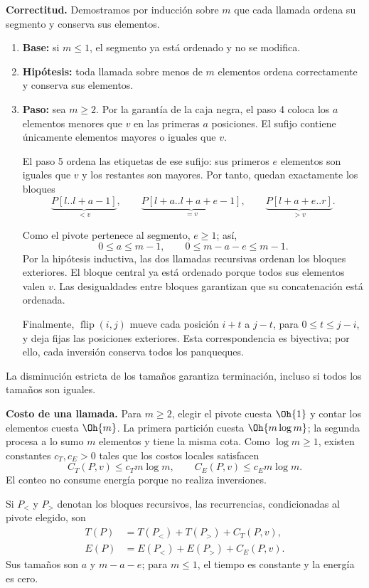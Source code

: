 \textbf{Correctitud.} Demostramos por inducción sobre $m$ que cada llamada ordena su segmento y conserva sus elementos.

\begin{enumerate}
\item \textbf{Base:} si $m\le1$, el segmento ya está ordenado y no se modifica.

\item \textbf{Hipótesis:} toda llamada sobre menos de $m$ elementos ordena correctamente y conserva sus elementos.

\item \textbf{Paso:} sea $m\ge2$. Por la garantía de la caja negra, el paso 4 coloca los $a$ elementos menores que $v$ en las primeras $a$ posiciones. El sufijo contiene únicamente elementos mayores o iguales que $v$.

El paso 5 ordena las etiquetas de ese sufijo: sus primeros $e$ elementos son iguales que $v$ y los restantes son mayores. Por tanto, quedan exactamente los bloques
\[
\underbrace{P[l..l+a-1]}_{<v},\qquad
\underbrace{P[l+a..l+a+e-1]}_{=v},\qquad
\underbrace{P[l+a+e..r]}_{>v}.
\]

Como el pivote pertenece al segmento, $e\ge1$; así,
\[
0\le a\le m-1,\qquad 0\le m-a-e\le m-1.
\]
Por la hipótesis inductiva, las dos llamadas recursivas ordenan los bloques exteriores. El bloque central ya está ordenado porque todos sus elementos valen $v$. Las desigualdades entre bloques garantizan que su concatenación está ordenada.

Finalmente, $\operatorname{flip}(i,j)$ mueve cada posición $i+t$ a $j-t$, para $0\le t\le j-i$, y deja fijas las posiciones exteriores. Esta correspondencia es biyectiva; por ello, cada inversión conserva todos los panqueques.
\end{enumerate}

La disminución estricta de los tamaños garantiza terminación, incluso si todos los tamaños son iguales.

\textbf{Costo de una llamada.} Para $m\ge2$, elegir el pivote cuesta $\Oh{1}$ y contar los elementos cuesta $\Oh{m}$. La primera partición cuesta $\Oh{m\log m}$; la segunda procesa a lo sumo $m$ elementos y tiene la misma cota. Como $\log m\ge1$, existen constantes $c_T,c_E>0$ tales que los costos locales satisfacen
\[
C_T(P,v)\le c_Tm\log m,\qquad
C_E(P,v)\le c_Em\log m.
\]
El conteo no consume energía porque no realiza inversiones.

Si $P_{<}$ y $P_{>}$ denotan los bloques recursivos, las recurrencias, condicionadas al pivote elegido, son
\[
\begin{aligned}
T(P)&=T(P_{<})+T(P_{>})+C_T(P,v),\\
E(P)&=E(P_{<})+E(P_{>})+C_E(P,v).
\end{aligned}
\]
Sus tamaños son $a$ y $m-a-e$; para $m\le1$, el tiempo es constante y la energía es cero.


